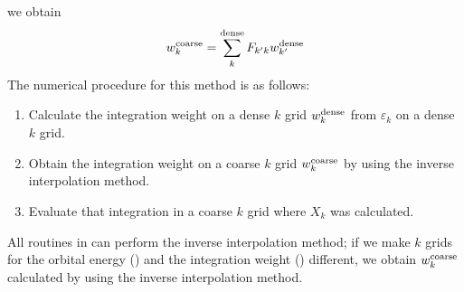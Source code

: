 \documentclass[letterpaper,10pt,pdftex,openany,english]{sphinxmanual}
\begin{document}
\sphinxAtStartPar
we obtain
\begin{equation*}
\begin{split}\begin{align}
w_k^{\rm coarse} = \sum_k^{\rm dense} F_{k' k}
w_{k'}^{\rm dense}
\end{align}\end{split}
\end{equation*}
\sphinxAtStartPar
The numerical procedure for this method is as follows:
\begin{enumerate}
%
\item {} 
\sphinxAtStartPar
Calculate the integration weight on a dense \(k\) grid
\(w_k^{\rm dense}\) from \(\varepsilon_k\) on a dense \(k\) grid.

\item {} 
\sphinxAtStartPar
Obtain the integration weight on a coarse \(k\) grid \(w_k^{\rm
coarse}\) by using the inverse interpolation method.

\item {} 
\sphinxAtStartPar
Evaluate that integration in a coarse \(k\) grid where \(X_k\) was
calculated.

\end{enumerate}

\sphinxAtStartPar
All routines in  can perform the inverse interpolation
method; if we make \(k\) grids for the orbital energy () and the
integration weight () different, we obtain \(w_k^{\rm coarse}\)
calculated by using the inverse interpolation method.
\end{document}
